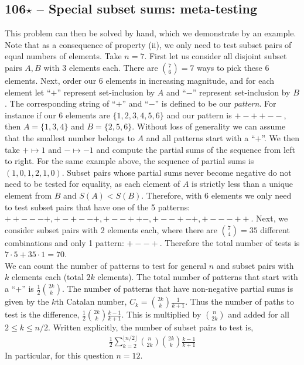 \documentclass{article}
\begin{document}
\subsection*{106$\star$ -- Special subset sums: meta-testing} 
This problem can then be solved by hand, which we demonstrate by an example. 
Note that as a consequence of property (ii), we only need to test subset pairs of equal numbers of elements. 
Take $n=7$. 
First let us consider all disjoint subset pairs $A, B$ with 3 elements each. 
There are $\binom{7}{6} = 7$ ways to pick these 6 elements. 
Next, order our 6 elements in increasing magnitude, and for each element let ``$+$'' represent set-inclusion by $A$ and ``$-$'' represent set-inclusion by $B$. 
The corresponding string of ``$+$'' and ``$-$'' is defined to be our \textit{pattern}. 
For instance if our 6 elements are $\{1, 2, 3, 4, 5, 6\}$ and our pattern is $+-++--$, then $A = \{1, 3, 4\}$ and $B = \{2, 5, 6\}$. 
Without loss of generality we can assume that the smallest number belongs to $A$ and all patterns start with a ``$+$''. 
We then take $+ \mapsto 1$ and $- \mapsto -1$ and compute the partial sums of the sequence from left to right. 
For the same example above, the sequence of partial sums is $(1, 0, 1, 2, 1, 0)$. 
Subset pairs whose partial sums never become negative do not need to be tested for equality, as each element of $A$ is strictly less than a unique element from $B$ and $S(A) < S(B)$. 
Therefore, with 6 elements we only need to test subset pairs that have one of the 5 patterns: $++---+, +-+--+, +--++-, +--+-+, +---++$. 
Next, we consider subset pairs with 2 elements each, where there are $\binom{7}{4}=35$ different combinations and only 1 pattern: $+--+$. 
Therefore the total number of tests is $7\cdot5 + 35\cdot1 = 70$.\\

We can count the number of patterns to test for general $n$ and subset pairs with $k$ elements each (total $2k$ elements). 
The total number of patterns that start with a ``+'' is $\frac{1}{2}\binom{2k}{k}$. 
The number of patterns that have non-negative partial sums is given by the $k$th Catalan number, $C_k = \binom{2k}{k} \frac{1}{k+1}$. 
Thus the number of paths to test is the difference, $\frac{1}{2}\binom{2k}{k} \frac{k-1}{k+1}$. 
This is multiplied by $\binom{n}{2k}$ and added for all $2 \leq k \leq n/2$. 
Written explicitly, the number of subset pairs to test is,
\begin{align*}
	\boxed{ \frac{1}{2}\sum_{k=2}^{\lfloor{n/2}\rfloor} \binom{n}{2k} \binom{2k}{k} \frac{k-1}{k+1} }
\end{align*}
In particular, for this question $n = 12$.
\end{document}
